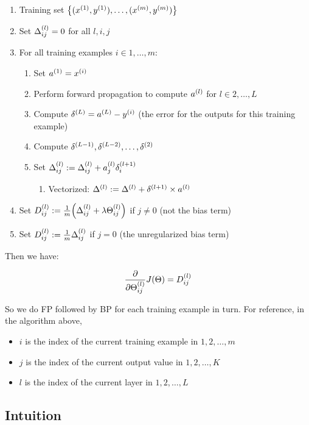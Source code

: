 \begin{enumerate}
    \item Training set $\qty{(x\s{1}, y\s{1}), \dots, (x\s{m}, y\s{m})}$
    \item Set $\Delta\ss{ij}{l} = 0$ for all $l,i,j$
    \item For all training examples $i \in 1, \dots, m$:
    \begin{enumerate}
        \item Set $a\s{1} = x\s{i}$
        \item Perform forward propagation to compute $a\s{l}$ for $l \in 2, \dots, L$
        \item Compute $\delta\s{L} = a\s{L} - y\s{i}$ (the error for the outputs for this training example)
        \item Compute $\delta\s{L-1}, \delta\s{L-2}, \dots, \delta\s{2}$
        \item Set $\Delta\ss{ij}{l} := \Delta\ss{ij}{l} + a\ss{j}{l} \delta\ss{i}{l+1}$
        \begin{enumerate}
            \item Vectorized: $\Delta\s{l} := \Delta\s{l} + \delta\s{l+1} \times a\s{l}$
        \end{enumerate}
    \end{enumerate}
    \item Set $D\ss{ij}{l} := \frac{1}{m} \qty( \Delta\ss{ij}{l} + \lambda \Theta\ss{ij}{l} )$ if $j \neq 0$ (not the bias term)
    \item Set $D\ss{ij}{l} := \frac{1}{m} \Delta\ss{ij}{l}$ if $j = 0$ (the unregularized bias term)
\end{enumerate}

Then we have:

\[ \pdv{\Theta\ss{ij}{l}} J(\Theta) = D\ss{ij}{l} \]

So we do FP followed by BP for each training example in turn.  For reference, in the algorithm above,

\begin{itemize}
    \item $i$ is the index of the current training example in $1,2,\dots,m$
    \item $j$ is the index of the current output value in $1,2,\dots,K$
    \item $l$ is the index of the current layer in $1,2,\dots,L$
\end{itemize}

\subsection{Intuition}

